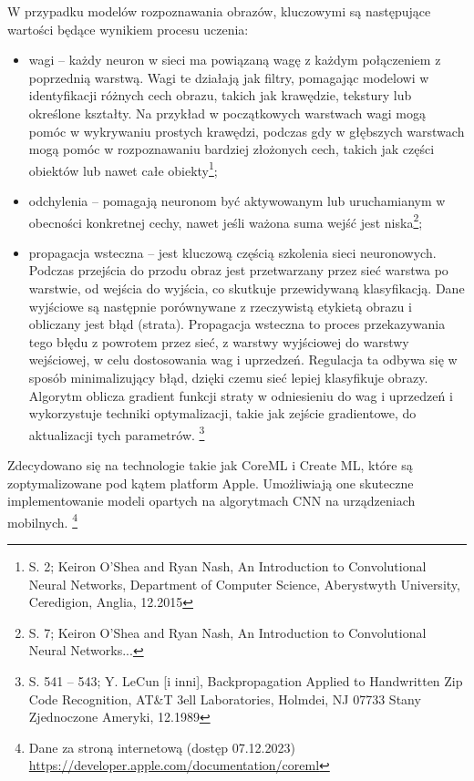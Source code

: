 \documentclass[12pt, a4paper, twoside, openany]{book}
\begin{document}
{W przypadku modelów rozpoznawania obrazów, kluczowymi są następujące wartości będące wynikiem procesu uczenia:
\begin{itemize}
    \item wagi -- każdy neuron w sieci ma powiązaną wagę z każdym połączeniem z poprzednią warstwą. Wagi te działają jak filtry, pomagając modelowi w identyfikacji różnych cech obrazu, takich jak krawędzie, tekstury lub określone kształty. Na przykład w początkowych warstwach wagi mogą pomóc w wykrywaniu prostych krawędzi, podczas gdy w głębszych warstwach mogą pomóc w rozpoznawaniu bardziej złożonych cech, takich jak części obiektów lub nawet całe obiekty\footnote{S. 2; Keiron O'Shea and Ryan Nash, An Introduction to Convolutional Neural Networks, Department of Computer Science, Aberystwyth University, Ceredigion, Anglia, 12.2015};
    \item odchylenia -- pomagają neuronom być aktywowanym lub uruchamianym w obecności konkretnej cechy, nawet jeśli ważona suma wejść jest niska\footnote{S. 7; Keiron O'Shea and Ryan Nash, An Introduction to Convolutional Neural Networks...};
    \item propagacja wsteczna -- jest kluczową częścią szkolenia sieci neuronowych. Podczas przejścia do przodu obraz jest przetwarzany przez sieć warstwa po warstwie, od wejścia do wyjścia, co skutkuje przewidywaną klasyfikacją. Dane wyjściowe są następnie porównywane z rzeczywistą etykietą obrazu i obliczany jest błąd (strata). Propagacja wsteczna to proces przekazywania tego błędu z powrotem przez sieć, z warstwy wyjściowej do warstwy wejściowej, w celu dostosowania wag i uprzedzeń. Regulacja ta odbywa się w sposób minimalizujący błąd, dzięki czemu sieć lepiej klasyfikuje obrazy. Algorytm oblicza gradient funkcji straty w odniesieniu do wag i uprzedzeń i wykorzystuje techniki optymalizacji, takie jak zejście gradientowe, do aktualizacji tych parametrów. \footnote{S. 541 -- 543; Y. LeCun [i inni], Backpropagation Applied to Handwritten Zip Code Recognition, AT\&T 3ell Laboratories, Holmdei, NJ 07733 Stany Zjednoczone Ameryki, 12.1989}
\end{itemize}

Zdecydowano się na technologie takie jak CoreML i Create ML, które są zoptymalizowane pod kątem platform Apple.
Umożliwiają one skuteczne implementowanie modeli opartych na algorytmach CNN na urządzeniach mobilnych. \footnote{ Dane za stroną internetową (dostęp 07.12.2023) \url{https://developer.apple.com/documentation/coreml} }

}
\end{document}
